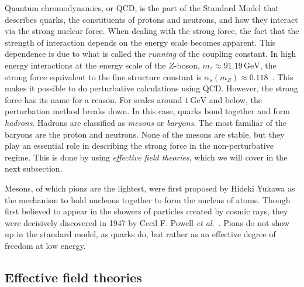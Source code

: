 Quantum chromodynamics, or QCD, is the part of the Standard Model that describes quarks, the constituents of protons and neutrons, and how they interact via the strong nuclear force.
When dealing with the strong force, the fact that the strength of interaction depends on the energy scale becomes apparent.
This dependence is due to what is called the \emph{running} of the coupling constant.
In high energy interactions at the energy scale of the $Z$-boson, $m_z \approx 91.19 \, \text{GeV}$, the strong force equivalent to the fine structure constant is $\alpha_s(m_Z) \approx 0.118$~\cite{PDG}.
This makes it possible to do perturbative calculations using QCD.
However, the strong force has its name for a reason.
For scales around $1\, \text{GeV}$ and below, the perturbation method breaks down.
In this case, quarks bond together and form \emph{hadrons}.
Hadrons are classified as \emph{mesons} or \emph{baryons}.
The most familiar of the baryons are the proton and neutrons.
None of the mesons are stable, but they play an essential role in describing the strong force in the non-perturbative regime.
This is done by using \emph{effective field theories}, which we will cover in the next subsection.


Mesons, of which pions are the lightest, were first proposed by Hideki Yukawa as the mechanism to hold nucleons together to form the nucleus of atoms.
Though first believed to appear in the showers of particles created by cosmic rays, they were decisively discovered in 1947 by Cecil F. Powell \emph{et al.}~\cite{griffiths:introduction}.
Pions do not show up in the standard model, as quarks do, but rather as an effective degree of freedom at low energy.


\subsection*{Effective field theories}

